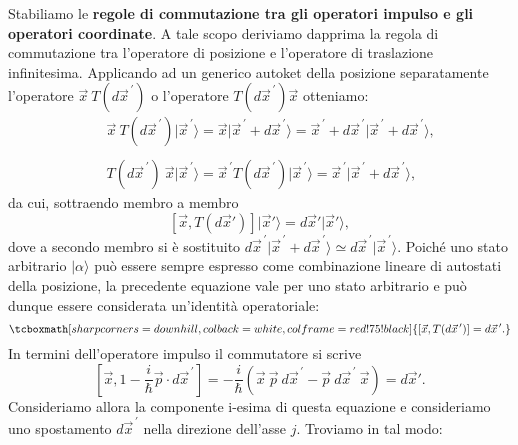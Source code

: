 \documentclass[a4paper,12pt,oneside]{book}
\begin{document}
Stabiliamo le \textbf{regole di commutazione tra gli operatori impulso e gli operatori coordinate}. A tale scopo deriviamo dapprima la regola di commutazione tra l'operatore di posizione e l'operatore di traslazione infinitesima. Applicando ad un generico autoket della posizione separatamente l'operatore $\vec{x}\ T(d{\vec{x}}^{\, \prime})$ o l'operatore $T(d{\vec{x}}^{\, \prime})\vec{x}$ otteniamo:
	\begin{eqnarray}
		& & \vec{x}\ T(d{\vec{x}}^{\, \prime})\vert {\vec{x}}^{\, \prime} \rangle = \vec{x}\vert{\vec{x}}^{\, \prime}+d{\vec{x}}^{\, \prime}\rangle ={\vec{x}}^{\, \prime}+d{\vec{x}}^{\, \prime}\vert{\vec{x}}^{\, \prime}+d{\vec{x}}^{\, \prime}\rangle ,  \\
 \nonumber \\
		& & T(d{\vec{x}}^{\, \prime})\ \vec{x} \vert {\vec{x}}^{\, \prime} \rangle = {\vec{x}}^{\, \prime} T(d{\vec{x}}^{\, \prime})\vert {\vec{x}}^{\, \prime}\rangle = {\vec{x}}^{\, \prime}\vert {\vec{x}}^{\, \prime}+d{\vec{x}}^{\, \prime}\rangle ,
	\end{eqnarray}
da cui, sottraendo membro a membro
	\begin{equation}
		\left[\vec{x}, T(d\vec{x}')\right]\vert \vec{x}' \rangle = d\vec{x}' \vert \vec{x}' \rangle ,
	\end{equation}
dove a secondo membro si è sostituito $d{\vec{x}}^{\, \prime} \vert {\vec{x}}^{\, \prime}+d{\vec{x}}^{\, \prime}\rangle \simeq d{\vec{x}}^{\, \prime} \vert {\vec{x}}^{\, \prime}\rangle$. Poiché uno stato arbitrario $\vert \alpha \rangle $ può essere sempre espresso come combinazione lineare di autostati della posizione, la precedente equazione vale per uno stato arbitrario e può dunque essere considerata un'identità operatoriale:
	\begin{equation}
		\tcboxmath[sharp corners=downhill ,colback=white,colframe=red!75!black]{	
			\left[\vec{x}, T(d{\vec{x}}^{\, \prime})\right] = d{\vec{x}}^{\, \prime} .
			}
	\end{equation}
In termini dell'operatore impulso il commutatore si scrive
	\begin{equation}
		\left[ \vec{x}, 1- \frac{i}{\hbar}\vec{p}\cdot d{\vec{x}}^{\, \prime}\right] =-\frac{i}{\hbar}\left(\vec{x}\ \vec{p}\ d{\vec{x}}^{\, \prime}-\vec{p}\ d{\vec{x}}^{\, \prime}\ \vec{x} \right) =d\vec{x}' .
	\end{equation}
Consideriamo allora la componente i-esima di questa equazione e consideriamo uno spostamento $d{\vec{x}}^{\, \prime}$ nella direzione dell'asse $j$. Troviamo in tal modo:
\end{document}
